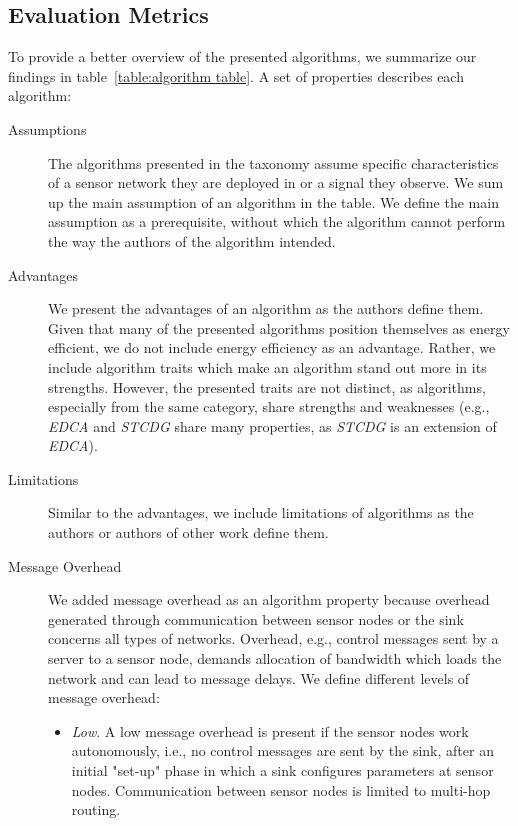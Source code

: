\subsection{Evaluation Metrics}
\label{sec:Evaluation Metrics}

To provide a better overview of the presented algorithms, we summarize our
findings in table~\ref{table:algorithm table}. A
set of properties describes each algorithm:

\begin{description}
    \item[Assumptions]
        The algorithms presented in the taxonomy assume specific characteristics
        of a sensor network they are deployed in or a signal they observe. We
        sum up the main assumption of an algorithm in the table. We define the
        main assumption as a prerequisite, without which the algorithm cannot
        perform the way the authors of the algorithm intended.
    \item[Advantages]
        We present the advantages of an algorithm as the authors define them.
        Given that many of the presented algorithms position themselves as
        energy efficient, we do not include energy efficiency as an advantage.
        Rather, we include algorithm traits which make an algorithm stand out
        more in its strengths. However, the presented traits are not distinct,
        as algorithms, especially from the same category, share strengths and
        weaknesses (e.g., \textit{EDCA} and \textit{STCDG} share many properties, as
        \textit{STCDG} is an extension of \textit{EDCA}).
    \item[Limitations]
        Similar to the advantages, we include limitations of algorithms as the
        authors or authors of other work define them. 
    \item[Message Overhead]
        We added message overhead as an algorithm property because overhead
        generated through communication between sensor nodes or the sink
        concerns all types of networks. Overhead, e.g., control messages sent by
        a server to a sensor node, demands allocation of bandwidth which loads
        the network and can lead to message delays. We define different levels
        of message overhead:

        \begin{itemize}
            \item \textit{Low}. A low message overhead is present if the sensor
            nodes work autonomously, i.e., no control messages are sent by the
            sink, after an initial "set-up" phase in which a sink configures
            parameters at sensor nodes. Communication between sensor nodes is
            limited to multi-hop routing.


\end{itemize}
\end{description}
